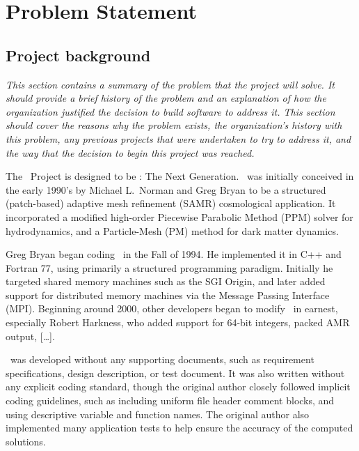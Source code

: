 \documentclass[12pt]{article}
\begin{document}

\section{Problem Statement}
\subsection{Project background}

    \textit{This section contains a summary of the problem that the project
    will solve. It should provide a brief history of the problem and
    an explanation of how the organization justified the decision to
    build software to address it. This section should cover the
    reasons why the problem exists, the organization's history with
    this problem, any previous projects that were undertaken to try to
    address it, and the way that the decision to begin this project
    was reached.}

    The \cello\ Project is designed to be \enzo: The Next Generation.
    \enzo\ was initially conceived in the early 1990's by Michael
    L.~Norman and Greg Bryan to be a structured (patch-based) adaptive
    mesh refinement (SAMR) cosmological application.  It incorporated
    a modified high-order Piecewise Parabolic Method (PPM) solver for
    hydrodynamics, and a Particle-Mesh (PM) method for dark matter
    dynamics.

    Greg Bryan began coding \enzo\ in the Fall of 1994.  He
    implemented it in C++ and Fortran 77, using primarily a structured
    programming paradigm.  Initially he targeted shared memory
    machines such as the SGI Origin, and later added support for
    distributed memory machines via the Message Passing Interface
    (MPI).  Beginning around 2000, other developers began to modify
    \enzo\ in earnest, especially Robert Harkness, who added support
    for 64-bit integers, packed AMR output, [\ldots].

    \enzo\ was developed without any supporting documents, such as
    requirement specifications, design description, or test document.
    It was also written without any explicit coding standard, though
    the original author closely followed implicit coding guidelines,
    such as including uniform file header comment blocks, and using
    descriptive variable and function names.  The original author also
    implemented many application tests to help ensure the accuracy
    of the computed solutions.
\end{document}
